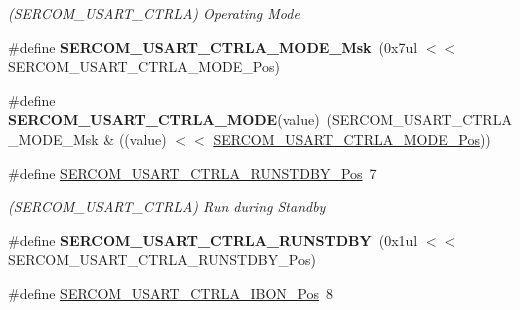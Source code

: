 \begin{DoxyCompactItemize}
\begin{DoxyCompactList}\small\item\em (S\+E\+R\+C\+O\+M\+\_\+\+U\+S\+A\+R\+T\+\_\+\+C\+T\+R\+L\+A) Operating Mode \end{DoxyCompactList}\item 
\hypertarget{group___s_a_m_l21___s_e_r_c_o_m_gac0f1f78955a4803a5fdd4b5237969d43}{}\#define {\bfseries S\+E\+R\+C\+O\+M\+\_\+\+U\+S\+A\+R\+T\+\_\+\+C\+T\+R\+L\+A\+\_\+\+M\+O\+D\+E\+\_\+\+Msk}~(0x7ul $<$$<$ S\+E\+R\+C\+O\+M\+\_\+\+U\+S\+A\+R\+T\+\_\+\+C\+T\+R\+L\+A\+\_\+\+M\+O\+D\+E\+\_\+\+Pos)\label{group___s_a_m_l21___s_e_r_c_o_m_gac0f1f78955a4803a5fdd4b5237969d43}

\item 
\hypertarget{group___s_a_m_l21___s_e_r_c_o_m_ga0775d42532a2638e572e0cc1cabf0b94}{}\#define {\bfseries S\+E\+R\+C\+O\+M\+\_\+\+U\+S\+A\+R\+T\+\_\+\+C\+T\+R\+L\+A\+\_\+\+M\+O\+D\+E}(value)~(S\+E\+R\+C\+O\+M\+\_\+\+U\+S\+A\+R\+T\+\_\+\+C\+T\+R\+L\+A\+\_\+\+M\+O\+D\+E\+\_\+\+Msk \& ((value) $<$$<$ \hyperlink{group___s_a_m_l21___s_e_r_c_o_m_ga0796e7296d74a5202c5a9fc61ea9ea3b}{S\+E\+R\+C\+O\+M\+\_\+\+U\+S\+A\+R\+T\+\_\+\+C\+T\+R\+L\+A\+\_\+\+M\+O\+D\+E\+\_\+\+Pos}))\label{group___s_a_m_l21___s_e_r_c_o_m_ga0775d42532a2638e572e0cc1cabf0b94}

\item 
\hypertarget{group___s_a_m_l21___s_e_r_c_o_m_ga34d2008a78308b99b8a3cc7f8426ccee}{}\#define \hyperlink{group___s_a_m_l21___s_e_r_c_o_m_ga34d2008a78308b99b8a3cc7f8426ccee}{S\+E\+R\+C\+O\+M\+\_\+\+U\+S\+A\+R\+T\+\_\+\+C\+T\+R\+L\+A\+\_\+\+R\+U\+N\+S\+T\+D\+B\+Y\+\_\+\+Pos}~7\label{group___s_a_m_l21___s_e_r_c_o_m_ga34d2008a78308b99b8a3cc7f8426ccee}

\begin{DoxyCompactList}\small\item\em (S\+E\+R\+C\+O\+M\+\_\+\+U\+S\+A\+R\+T\+\_\+\+C\+T\+R\+L\+A) Run during Standby \end{DoxyCompactList}\item 
\hypertarget{group___s_a_m_l21___s_e_r_c_o_m_gac8c4bb6097257f1fd7b77c1ae2ed003b}{}\#define {\bfseries S\+E\+R\+C\+O\+M\+\_\+\+U\+S\+A\+R\+T\+\_\+\+C\+T\+R\+L\+A\+\_\+\+R\+U\+N\+S\+T\+D\+B\+Y}~(0x1ul $<$$<$ S\+E\+R\+C\+O\+M\+\_\+\+U\+S\+A\+R\+T\+\_\+\+C\+T\+R\+L\+A\+\_\+\+R\+U\+N\+S\+T\+D\+B\+Y\+\_\+\+Pos)\label{group___s_a_m_l21___s_e_r_c_o_m_gac8c4bb6097257f1fd7b77c1ae2ed003b}

\item 
\hypertarget{group___s_a_m_l21___s_e_r_c_o_m_ga8c9af0e4149441c3319b0869a3f5eb79}{}\#define \hyperlink{group___s_a_m_l21___s_e_r_c_o_m_ga8c9af0e4149441c3319b0869a3f5eb79}{S\+E\+R\+C\+O\+M\+\_\+\+U\+S\+A\+R\+T\+\_\+\+C\+T\+R\+L\+A\+\_\+\+I\+B\+O\+N\+\_\+\+Pos}~8\label{group___s_a_m_l21___s_e_r_c_o_m_ga8c9af0e4149441c3319b0869a3f5eb79}


\end{DoxyCompactItemize}
